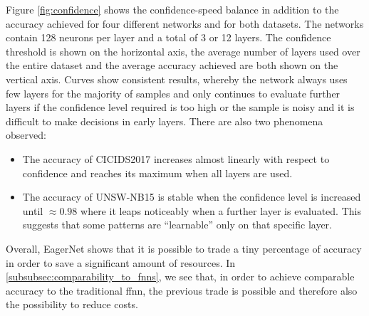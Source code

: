 \documentclass[conference]{IEEEtran}
\begin{document}
Figure \ref{fig:confidence} shows the confidence-speed balance in addition to the accuracy achieved for four different networks and for both datasets. The networks contain 128 neurons per layer and a total of 3 or 12 layers. The confidence threshold is shown on the horizontal axis, the average number of layers used over the entire dataset and the average accuracy achieved are both shown on the vertical axis. Curves show consistent results, whereby the network always uses few layers for the majority of samples and only continues to evaluate further layers if the confidence level required is too high or the sample is noisy and it is difficult to make decisions in early layers. There are also two phenomena observed:
\begin{itemize}
\item The accuracy of CICIDS2017 increases almost linearly with respect to confidence and reaches its maximum when all layers are used.
\item The accuracy of UNSW-NB15 is stable when the confidence level is increased until $\approx 0.98$ where it leaps noticeably when a further layer is evaluated. This suggests that some patterns are ``learnable'' only on that specific layer.
\end{itemize}
Overall, EagerNet shows that it is possible to trade a tiny percentage of accuracy in order to save a significant amount of resources. In \autoref{subsubsec:comparability_to_fnns}, we see that, in order to achieve comparable accuracy to the traditional \gls{ffnn}, the previous trade is possible and therefore also the possibility to reduce costs.
\end{document}
